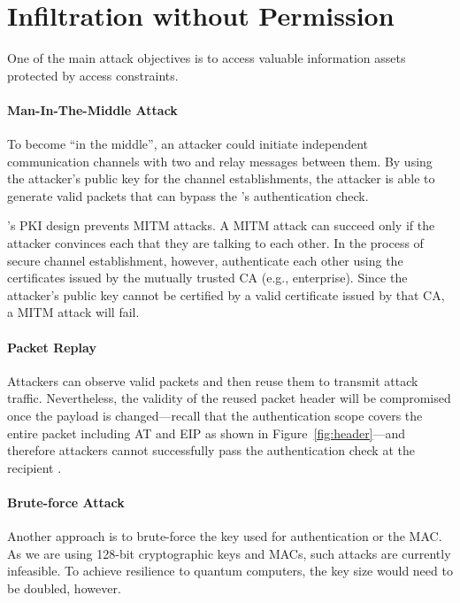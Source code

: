 \section{Infiltration without Permission}
\label{sec:infiltration}

One of the main attack objectives is to access valuable information assets
protected by access constraints.

\paragraph{Man-In-The-Middle Attack}
To become ``in the middle'', an attacker could initiate independent communication channels
with two \tps and relay messages between them. By using the attacker's public key for the
channel establishments, the attacker is able to generate valid packets that can bypass the
\tp's authentication check.

\name's PKI design prevents MITM attacks. A MITM attack
can succeed only if the attacker convinces each \tp that they are talking to each other.
In the process of secure channel establishment, however, \tps authenticate each other using
the certificates issued by the mutually trusted CA (e.g., enterprise). Since the attacker's
public key cannot be certified by a valid certificate issued by that CA, a MITM attack will fail.


\paragraph{Packet Replay}
Attackers can observe valid \name packets and then reuse them to transmit attack traffic.
Nevertheless, the validity of the reused packet header will be compromised once the payload
is changed---recall that the authentication scope covers the entire packet including
AT and EIP as shown in Figure~\ref{fig:header}---and therefore attackers cannot
successfully pass the authentication check at the recipient \tp.


\paragraph{Brute-force Attack}
Another approach is to brute-force the key used for authentication or the MAC. As we are using 128-bit cryptographic keys and MACs, such attacks are currently infeasible. To achieve resilience to quantum computers, the key size would need to be doubled, however.


